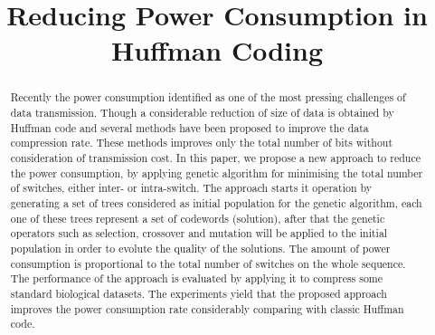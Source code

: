 \documentclass[preprint,12pt]{elsarticle}
\begin{document}
\begin{frontmatter}



\title{Reducing Power Consumption in Huffman Coding}


\author{}

\address{}

\begin{abstract}
Recently the power consumption identified as one of the most pressing challenges of data transmission. Though a considerable reduction of size of data is obtained by Huffman code and several methods have been proposed to improve the data compression rate. These methods improves only the total number of bits without consideration of transmission cost. In this paper, we propose a new approach to reduce the power consumption, by applying genetic algorithm for minimising the total number of switches, either inter- or intra-switch. 
The approach starts it operation by generating a set of trees considered as initial population for the genetic algorithm, each one of these trees represent a set of codewords (solution), after that the genetic operators such as selection, crossover and mutation will be applied to the initial population in order to evolute the quality of the solutions. The amount of power consumption is proportional to the total number of switches on the whole sequence. 
The performance of the approach is evaluated by applying it to compress some standard biological datasets. The experiments yield that the proposed approach improves the power consumption rate considerably comparing with classic Huffman code.
\end{abstract}

\begin{keyword}



\end{keyword}

\end{frontmatter}
\end{document}
